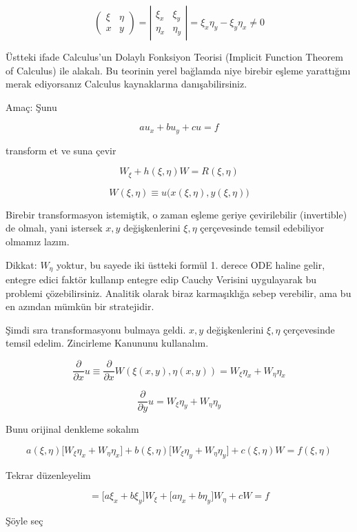 \documentclass[12pt,fleqn]{article}\usepackage{../../common}
\begin{document}
$$ 
\left(\begin{array}{rr}
\xi & \eta \\
x & y
\end{array}\right) = 
\left|\begin{array}{rr}
\xi_x & \xi_y \\
\eta_x & \eta_y
\end{array}\right| =
\xi_x \eta_y - \xi_y \eta_x \ne 0
 $$

Üstteki ifade Calculus'un Dolaylı Fonksiyon Teorisi (Implicit Function
Theorem of Calculus) ile alakalı. Bu teorinin yerel bağlamda niye birebir
eşleme yarattığını merak ediyorsanız Calculus kaynaklarına
danışabilirsiniz. 

Amaç: Şunu 

$$ au_x + bu_y + cu = f $$

transform et ve suna çevir

$$ W_\xi + h(\xi, \eta)W = R(\xi,\eta)$$


$$ W(\xi,\eta) \equiv u \bigg( x(\xi,\eta),y(\xi,\eta) \bigg) $$

Birebir transformasyon istemiştik, o zaman eşleme geriye çevirilebilir
(invertible) de olmalı, yani istersek $x,y$ değişkenlerini $\xi,\eta$
çerçevesinde temsil edebiliyor olmamız lazım. 

Dikkat: $W_\eta$ yoktur, bu sayede iki üstteki formül 1. derece ODE haline
gelir, entegre edici faktör kullanıp entegre edip Cauchy Verisini
uygulayarak bu problemi çözebilirsiniz. Analitik olarak biraz karmaşıklığa
sebep verebilir, ama bu en azından mümkün bir stratejidir. 

Şimdi sıra transformasyonu bulmaya geldi. $x,y$ değişkenlerini $\xi,\eta$
çerçevesinde temsil edelim. Zincirleme Kanununu kullanalım. 

$$ \frac{\partial }{\partial x}u \equiv
\frac{\partial }{\partial x}W(\xi(x,y),\eta(x,y)) =
W_\xi\eta_x + W_\eta\eta_x 
 $$

$$ \frac{\partial }{\partial y}u =
W_\xi\eta_y + W_\eta\eta_y
 $$

Bunu orijinal denkleme sokalım 

$$ 
a(\xi,\eta) \bigg[W_\xi \eta_x + W_\eta\eta_x \bigg] +
b(\xi,\eta) \bigg[W_\xi \eta_y + W_\eta\eta_y  \bigg] + 
c(\xi,\eta)W = f(\xi,\eta)
 $$

Tekrar düzenleyelim

$$ = 
\bigg[ a\xi_x + b\xi_y \bigg] W_\xi + 
\bigg[ a\eta_x + b\eta_y \bigg] W_\eta +
cW = f
 $$

Şöyle seç
\end{document}
